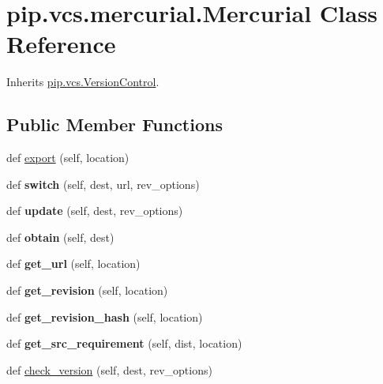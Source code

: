 \hypertarget{classpip_1_1vcs_1_1mercurial_1_1_mercurial}{}\section{pip.\+vcs.\+mercurial.\+Mercurial Class Reference}
\label{classpip_1_1vcs_1_1mercurial_1_1_mercurial}


Inherits \hyperlink{classpip_1_1vcs_1_1_version_control}{pip.\+vcs.\+Version\+Control}.

\subsection*{Public Member Functions}
\begin{DoxyCompactItemize}
\item 
def \hyperlink{classpip_1_1vcs_1_1mercurial_1_1_mercurial_ab3c1eb75424a06c6e8b119eb2507c31c}{export} (self, location)
\item 
\mbox{\label{classpip_1_1vcs_1_1mercurial_1_1_mercurial_ae6b9836b73778f892359ddd13e501bf1}} 
def {\bfseries switch} (self, dest, url, rev\+\_\+options)
\item 
\mbox{\label{classpip_1_1vcs_1_1mercurial_1_1_mercurial_ab2ed31b865528638f7af1f26ecc5383b}} 
def {\bfseries update} (self, dest, rev\+\_\+options)
\item 
\mbox{\label{classpip_1_1vcs_1_1mercurial_1_1_mercurial_a9116031a93d5f78262157cbe45133f68}} 
def {\bfseries obtain} (self, dest)
\item 
\mbox{\label{classpip_1_1vcs_1_1mercurial_1_1_mercurial_a25ac37c81ee093d957c23bda8663006d}} 
def {\bfseries get\+\_\+url} (self, location)
\item 
\mbox{\label{classpip_1_1vcs_1_1mercurial_1_1_mercurial_a94d1aadab0d6dc3afd81f352553ac1cf}} 
def {\bfseries get\+\_\+revision} (self, location)
\item 
\mbox{\label{classpip_1_1vcs_1_1mercurial_1_1_mercurial_a03f0522984ae74843d109f216c7b2111}} 
def {\bfseries get\+\_\+revision\+\_\+hash} (self, location)
\item 
\mbox{\label{classpip_1_1vcs_1_1mercurial_1_1_mercurial_a4b2c62c7bbe7b972c43e85e8da25d823}} 
def {\bfseries get\+\_\+src\+\_\+requirement} (self, dist, location)
\item 
def \hyperlink{classpip_1_1vcs_1_1mercurial_1_1_mercurial_ab48bcbc82c1f84cef9e7b9730d6cd3af}{check\+\_\+version} (self, dest, rev\+\_\+options)
\end{DoxyCompactItemize}
